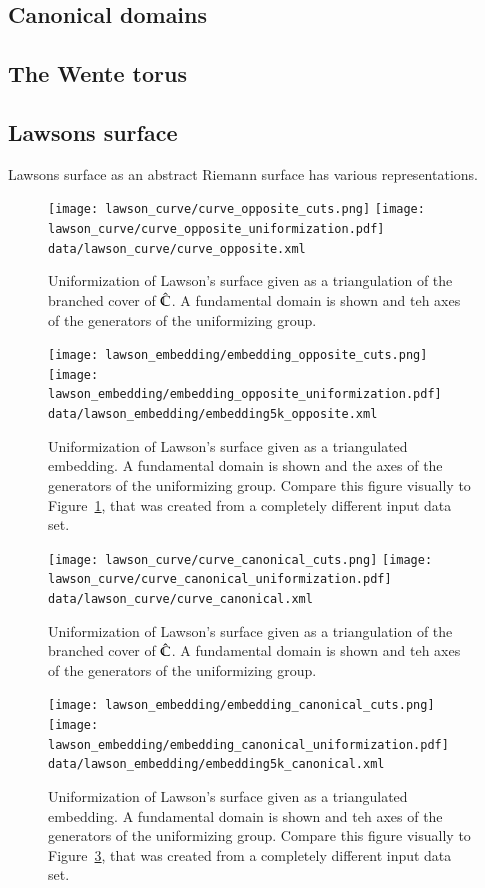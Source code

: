 \documentclass[Thesis.tex]{subfiles}
\begin{document}
\subsection{Canonical domains}
\subsection{The Wente torus}
\subsection{Lawsons surface}

Lawsons surface as an abstract Riemann surface has various representations. 

\begin{figure}
	\centering
	\texttt{[image: lawson\_curve/curve\_opposite\_cuts.png]}
	\texttt{[image: lawson\_curve/curve\_opposite\_uniformization.pdf]}
	{\scriptsize\tt data/lawson\_curve/curve\_opposite.xml}
	\caption{Uniformization of Lawson's surface given as a triangulation
of the branched cover of $\hat{\mathbb C}$. A fundamental domain is shown and
teh axes of the generators of the uniformizing group.}
	\label{fig:lawson_curve_opposite}
\end{figure}


\begin{figure}
	\centering
	\texttt{[image: lawson\_embedding/embedding\_opposite\_cuts.png]}
	\texttt{[image: lawson\_embedding/embedding\_opposite\_uniformization.pdf]}
	{\scriptsize\tt data/lawson\_embedding/embedding5k\_opposite.xml}
	\caption{Uniformization of Lawson's surface given as a triangulated embedding. A fundamental domain is shown and the axes of the generators of the uniformizing group. Compare this figure visually to Figure~\ref{fig:lawson_curve_opposite}, that was created 
from a completely different input data set.}
	\label{fig:lawson_embedding_opposite}
\end{figure}

\begin{figure}
	\centering
	\texttt{[image: lawson\_curve/curve\_canonical\_cuts.png]}
	\texttt{[image: lawson\_curve/curve\_canonical\_uniformization.pdf]}
	{\scriptsize\tt data/lawson\_curve/curve\_canonical.xml}
	\caption{Uniformization of Lawson's surface given as a triangulation
of the branched cover of $\hat{\mathbb C}$. A fundamental domain is shown and
teh axes of the generators of the uniformizing group.}
	\label{fig:lawson_curve_canonical}
\end{figure}


\begin{figure}
	\centering
	\texttt{[image: lawson\_embedding/embedding\_canonical\_cuts.png]}
	\texttt{[image: lawson\_embedding/embedding\_canonical\_uniformization.pdf]}
	{\scriptsize\tt data/lawson\_embedding/embedding5k\_canonical.xml}
	\caption{Uniformization of Lawson's surface given as a triangulated embedding. A fundamental domain is shown and
teh axes of the generators of the uniformizing group. Compare this figure visually to Figure~\ref{fig:lawson_curve_canonical}, that was created from a 
completely different input data set.}
	\label{fig:lawson_embedding_canonical}
\end{figure}
\end{document}
